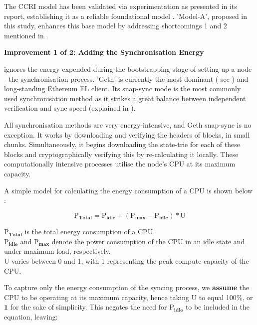 The CCRI model has been validated via experimentation as presented in its report, establishing it as a reliable foundational model \cite{CryptoCarbonRatingsInstitute2022TheNetwork}. 'Model-A', proposed in this study, enhances this base model by addressing shortcomings 1 and 2 mentioned in .

\textbf{Improvement 1 of 2: Adding the Synchronisation Energy} 

  ignores the energy expended during the bootstrapping stage of setting up a node - the synchronisation process. 'Geth' is currently the most dominant ( see ) and long-standing Ethereum EL client. Its snap-sync mode is the most commonly used synchronisation method as it strikes a great balance between independent verification and sync speed (explained in ).

 All synchronisation methods are very energy-intensive, and Geth snap-sync is no exception. It works by downloading and verifying the headers of blocks, in small chunks. Simultaneously, it begins downloading the state-trie for each of these blocks and cryptographically verifying this by re-calculating it locally. These computationally intensive processes utilise the node's CPU at its maximum capacity.

A simple model for calculating the energy consumption of a CPU is shown below \cite{PelleyUnderstandingPower} :

\begin{equation*}
    \boldsymbol{\mathrm{P}_{Total} = \mathrm{P}_{idle} + \left({\mathrm{P}_{max} - \mathrm{P}_{idle}}\right) * \mathrm{U}}
\end{equation*}

$\boldsymbol{\mathrm{P}_{Total}}$ is the total energy consumption of a CPU.\\
$\boldsymbol{\mathrm{P}_{idle}}$ and $\boldsymbol{\mathrm{P}_{max}}$ denote the power consumption of the CPU in an idle state and under maximum load, respectively.\\
$\boldsymbol{\mathrm{U}}$ varies between 0 and 1, with 1 representing the peak compute capacity of the CPU.

To capture only the energy consumption of the syncing process, we \textbf{assume} the CPU to be operating at its maximum capacity, hence taking $\boldsymbol{\mathrm{U}}$ to equal 100\%, or $\boldsymbol{1}$ for the sake of simplicity. This negates the need for $\boldsymbol{\mathrm{P}_{idle}}$ to be included in the equation, leaving:

